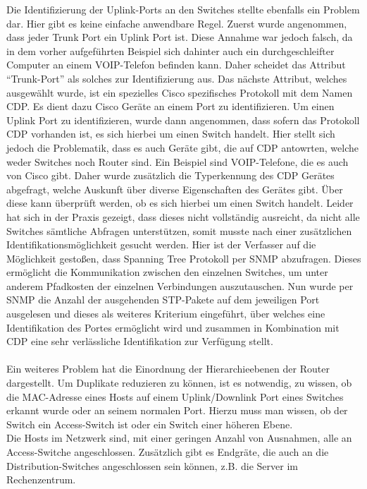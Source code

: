 Die Identifizierung der Uplink-Ports an den Switches stellte ebenfalls ein Problem dar. Hier gibt es keine einfache anwendbare Regel. Zuerst wurde angenommen, dass jeder Trunk Port ein Uplink Port ist. Diese Annahme war jedoch falsch, da in dem vorher aufgeführten Beispiel sich dahinter auch ein durchgeschleifter Computer an einem VOIP-Telefon befinden kann. Daher scheidet das Attribut “Trunk-Port” als solches zur Identifizierung aus. Das nächste Attribut, welches ausgewählt wurde, ist ein spezielles Cisco spezifisches Protokoll mit dem Namen CDP. Es dient dazu Cisco Geräte an einem Port zu identifizieren. Um einen Uplink Port zu identifizieren, wurde dann angenommen, dass sofern das Protokoll CDP vorhanden ist, es sich hierbei um einen Switch handelt. Hier stellt sich jedoch die Problematik, dass es auch Geräte gibt, die auf CDP antowrten, welche weder Switches noch Router sind. Ein Beispiel sind VOIP-Telefone, die es auch von Cisco gibt. Daher wurde zusätzlich die Typerkennung des CDP Gerätes abgefragt, welche Auskunft über diverse Eigenschaften des Gerätes gibt.
Über diese kann überprüft werden, ob es sich hierbei um einen Switch handelt. Leider hat sich in der Praxis gezeigt, dass dieses nicht vollständig ausreicht, da nicht alle Switches sämtliche Abfragen unterstützen, somit musste nach einer zusätzlichen Identifikationsmöglichkeit gesucht werden.
Hier ist der Verfasser auf die Möglichkeit gestoßen, dass Spanning Tree Protokoll per SNMP abzufragen. Dieses ermöglicht die Kommunikation zwischen den einzelnen Switches, um unter anderem Pfadkosten der einzelnen Verbindungen auszutauschen. Nun wurde per SNMP die Anzahl der ausgehenden STP-Pakete auf dem jeweiligen Port ausgelesen und dieses als weiteres Kriterium eingeführt, über welches eine Identifikation des Portes ermöglicht wird und zusammen in Kombination mit CDP eine sehr verlässliche Identifikation zur Verfügung stellt.\\\\
Ein weiteres Problem hat die Einordnung der Hierarchieebenen der Router dargestellt. Um Duplikate reduzieren zu können, ist es notwendig, zu wissen, ob die MAC-Adresse eines Hosts auf einem Uplink/Downlink Port eines Switches erkannt wurde oder an seinem normalen Port. Hierzu muss man wissen, ob der Switch ein Access-Switch ist oder ein Switch einer höheren Ebene.\\
Die Hosts im Netzwerk sind, mit einer geringen Anzahl von Ausnahmen, alle an Access-Switche angeschlossen.
Zusätzlich gibt es Endgräte, die auch an die Distribution-Switches angeschlossen sein können, z.B. die Server im Rechenzentrum. 
